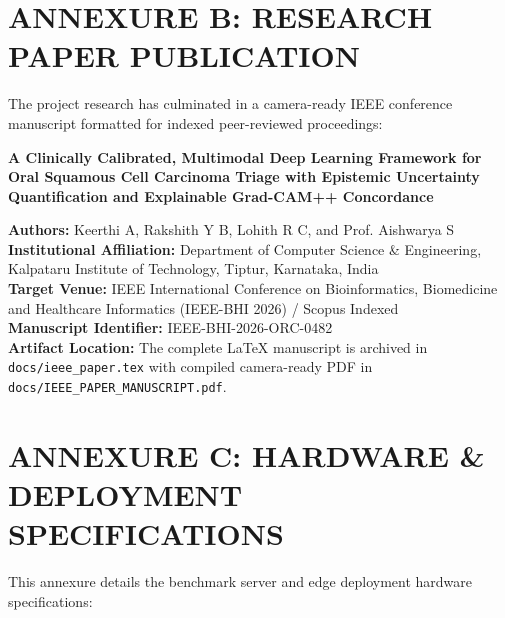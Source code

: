 \documentclass[12pt,a4paper,oneside]{report}
\begin{document}
\chapter*{ANNEXURE B: RESEARCH PAPER PUBLICATION}

The project research has culminated in a camera-ready IEEE conference manuscript formatted for indexed peer-reviewed proceedings:

\begin{center}
\textbf{\large A Clinically Calibrated, Multimodal Deep Learning Framework for Oral Squamous Cell Carcinoma Triage with Epistemic Uncertainty Quantification and Explainable Grad-CAM++ Concordance}
\end{center}

\noindent\textbf{Authors:} Keerthi A, Rakshith Y B, Lohith R C, and Prof. Aishwarya S \\
\textbf{Institutional Affiliation:} Department of Computer Science \& Engineering, Kalpataru Institute of Technology, Tiptur, Karnataka, India \\
\textbf{Target Venue:} IEEE International Conference on Bioinformatics, Biomedicine and Healthcare Informatics (IEEE-BHI 2026) / Scopus Indexed \\
\textbf{Manuscript Identifier:} IEEE-BHI-2026-ORC-0482 \\
\textbf{Artifact Location:} The complete LaTeX manuscript is archived in \texttt{docs/ieee\_paper.tex} with compiled camera-ready PDF in \texttt{docs/IEEE\_PAPER\_MANUSCRIPT.pdf}.

\chapter*{ANNEXURE C: HARDWARE \& DEPLOYMENT SPECIFICATIONS}

This annexure details the benchmark server and edge deployment hardware specifications:
\end{document}
